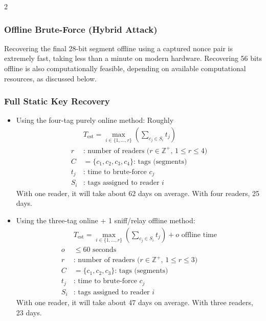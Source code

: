 \documentclass[10pt,letterpaper]{article}
\begin{document}
\begin{multicols}{2}
\begin{center}
    \resizebox{1.0\linewidth}{!}{}
    \captionsetup{hypcap=false}
    \label{fig:tear_recover_ulc}
\end{center}
\subsubsection*{Offline Brute-Force (Hybrid Attack)}
Recovering the final 28-bit segment offline using a captured nonce pair is extremely fast, taking less than a minute on modern hardware. Recovering 56 bits offline is also computationally feasible, depending on available computational resources, as discussed below.

\subsubsection*{Full Static Key Recovery}
\begin{itemize}
    \item Using the four-tag purely online method: Roughly
    \[
    \begin{aligned}
    &T_{\text{est}} = \max_{i \in \{1, \dots, r\}} \left( \sum_{c_j \in S_i} t_j \right) \\
    r &\text{: number of readers (}r \in \mathbb{Z}^+\text{, }1 \leq r \leq 4\text{)} \\
    C &= \{c_1, c_2, c_3, c_4\} \text{: tags (segments)} \\
    t_j &\text{: time to brute-force } c_j \\
    S_i &\text{: tags assigned to reader } i
    \end{aligned}
    \]
    With one reader, it will take about 62 days on average. With four readers, 25 days.

    \item Using the three-tag online + 1 sniff/relay offline method:
    \[
    \begin{aligned}
    &T_{\text{est}} = \max_{i \in \{1, \dots, r\}} \left( \sum_{c_j \in S_i} t_j \right) + {o}\text{ offline time} \\
    o & \leq 60\text{ seconds} \\
    r &\text{: number of readers (}r \in \mathbb{Z}^+\text{, }1 \leq r \leq 3\text{)} \\
    C &= \{c_1, c_2, c_3\} \text{: tags (segments)} \\
    t_j &\text{: time to brute-force } c_j \\
    S_i &\text{: tags assigned to reader } i
    \end{aligned}
    \]
    With one reader, it will take about 47 days on average. With three readers, 23 days.


\end{itemize}
\end{multicols}
\end{document}
